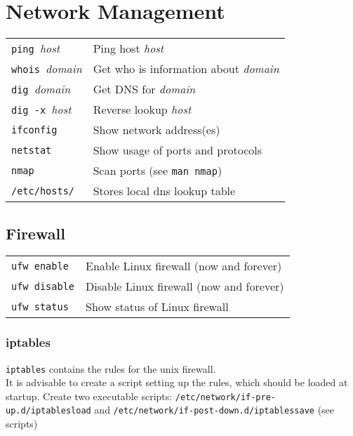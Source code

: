 \section{Network Management}
\begin{tabular}{@{}p{\the\MyLen}%
				@{}p{\linewidth-\the\MyLen}}
	\verb!ping !\textit{host}					& Ping host \textit{host}\\
	\verb!whois !\textit{domain}				& Get who is information about \textit{domain}\\
	\verb!dig !\textit{domain}					& Get DNS for \textit{domain}\\
	\verb!dig -x !\textit{host}					& Reverse lookup \textit{host}\\
	\verb!ifconfig!								& Show network address(es)\\
	\verb!netstat!								& Show usage of ports and protocols\\
	\verb!nmap!									& Scan ports (see \verb!man nmap!)\\
	\verb!/etc/hosts/!							& Stores local dns lookup table\\
\end{tabular}

\subsection{Firewall}
\begin{tabular}{@{}p{\the\MyLen}%
				@{}p{\linewidth-\the\MyLen}}
	\verb!ufw enable!				& Enable Linux firewall (now and forever)\\
	\verb!ufw disable!				& Disable Linux firewall (now and forever)\\
	\verb!ufw status!				& Show status of Linux firewall\\
\end{tabular}

\subsubsection{iptables}
\verb!iptables! contains the rules for the unix firewall.\\
It is advisable to create a script setting up the rules, which should be loaded at startup. Create two executable scripts:
\verb!/etc/network/if-pre-up.d/iptablesload! and \verb!/etc/network/if-post-down.d/iptablessave! (see scripts)\\

